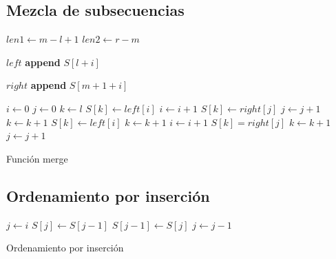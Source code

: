 \documentclass{article}
\begin{document}
\subsection{Mezcla de subsecuencias}
\begin{algorithm}[H]
\begin{algorithmic}[1]

  \State$len1\leftarrow m - l + 1$
  \State$len2\leftarrow r - m$


    \State$left$ \textbf{append} $S[l + i]$

  \EndFor

    \State$right$ \textbf{append} $S[m + 1 + i]$

  \EndFor
  \State$i\leftarrow 0$
  \State$j\leftarrow 0$
  \State$k\leftarrow l$
        \State$S[k] \leftarrow left[i]$
        \State$i \leftarrow i + 1$
    \Else
        \State$S[k] \leftarrow right[j]$
        \State$j \leftarrow j + 1$
    \EndElse
    \EndIf
    \State$k \leftarrow k + 1$
  \EndWhile
    \State$S[k] \leftarrow left[i]$
    \State$k \leftarrow k + 1$
    \State$i \leftarrow i + 1$
  \EndWhile
    \State$S[k] = right[j]$
    \State$k \leftarrow k + 1$
    \State$j \leftarrow j + 1$
  \EndWhile

\EndProcedure

\end{algorithmic}

\caption{Función merge}
\end{algorithm}

\subsection{Ordenamiento por inserción}

\begin{algorithm}[H]
\begin{algorithmic}[1]


    \State$j \leftarrow i$
        \State$S[j] \leftarrow S [j - 1]$
        \State$S[j - 1] \leftarrow S [j]$
        \State $j \leftarrow j - 1$
    \EndWhile

  \EndFor
  

\EndProcedure

\end{algorithmic}

\caption{Ordenamiento por inserción}
\end{algorithm}
\end{document}
